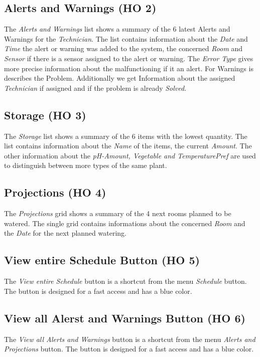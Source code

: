 \subsection{Alerts and Warnings (HO 2)}
The \emph{Alerts and Warnings} list shows a summary of the 6 latest Alerts and
Warnings for the \emph{Technician}. The list contains information about the
\emph{Date} and \emph{Time} the alert or warning was added to the system, the
concerned \emph{Room} and \emph{Sensor} if there is a sensor assigned to the
alert or warning. The \emph{Error Type} gives more precise information about the
malfunctioning if it an alert. For Warnings is describes the Problem.
Additionally we get Information about the assigned \emph{Technician} if assigned
and if the problem is already \emph{Solved}.

\subsection{Storage (HO 3)}
The \emph{Storage} list shows a summary of the 6 items with the lowest quantity.
The list contains information about the \emph{Name} of the items, the current
\emph{Amount}. The other information about the \emph{pH-Amount, Vegetable and
TemperaturePref} are used to distinguish between more types of the same plant.

\subsection{Projections (HO 4)}
The \emph{Projections} grid shows a summary of the 4 next rooms planned
to be watered. The single grid contains informations about the concerned
\emph{Room} and the \emph{Date} for the next planned watering.

\subsection{View entire Schedule Button (HO 5)}
The \emph{View entire Schedule} button is a shortcut from the menu
\emph{Schedule} button. The button is designed for a fast access and has a blue
color.

\subsection{View all Alerst and Warnings Button (HO 6)}
The \emph{View all Alerts and Warnings} button is a shortcut from the menu
\emph{Alerts and Projections} button. The button is designed for a fast access
and has a blue color.

